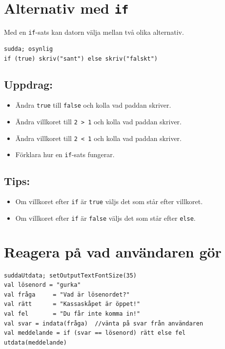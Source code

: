 \chapter{Alternativ med \lstinline{if}}Med en \lstinline{if}-sats kan datorn välja mellan två olika alternativ.

\begin{lstlisting}[basicstyle={\ttfamily\fontsize{20}{24}\selectfont},numbers=none]
sudda; osynlig
if (true) skriv("sant") else skriv("falskt")
\end{lstlisting}
        
\section*{\color{BrickRed}Uppdrag:}


\begin{itemize}

\item {Ändra \lstinline{true} till \lstinline{false} och kolla vad paddan skriver.}
\item {Ändra villkoret till \lstinline{2 > 1} och kolla vad paddan skriver.}
\item {Ändra villkoret till \lstinline{2 < 1} och kolla vad paddan skriver.}
\item {Förklara hur en \lstinline{if}-sats fungerar.}

\end{itemize}


\section*{\color{OliveGreen}Tips:}


\begin{itemize}

\item {Om villkoret efter \lstinline{if} är \lstinline{true} väljs det som står efter villkoret.}
\item {Om villkoret efter \lstinline{if} är \lstinline{false} väljs det som står efter \lstinline{else}.}

\end{itemize}


\chapter{Reagera på vad användaren gör}
\begin{lstlisting}[basicstyle={\ttfamily\fontsize{20}{24}\selectfont},numbers=none]
suddaUtdata; setOutputTextFontSize(35)
val lösenord = "gurka"
val fråga     = "Vad är lösenordet?"
val rätt      = "Kassaskåpet är öppet!"
val fel       = "Du får inte komma in!"
val svar = indata(fråga)  //vänta på svar från användaren
val meddelande = if (svar == lösenord) rätt else fel
utdata(meddelande)
\end{lstlisting}
        
